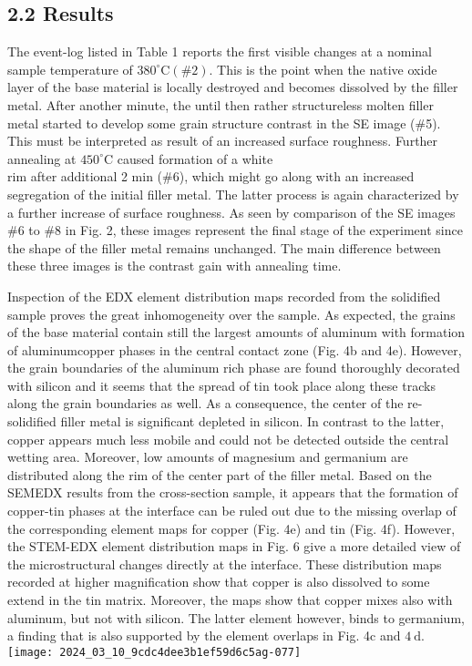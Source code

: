\documentclass[10pt]{article}
\begin{document}
\subsection*{2.2 Results}
The event-log listed in Table 1 reports the first visible changes at a nominal sample temperature of $380^{\circ} \mathrm{C}(\# 2)$. This is the point when the native oxide layer of the base material is locally destroyed and becomes dissolved by the filler metal. After another minute, the until then rather structureless molten filler metal started to develop some grain structure contrast in the SE image (\#5). This must be interpreted as result of an increased surface roughness. Further annealing at $450^{\circ} \mathrm{C}$ caused formation of a white\\
rim after additional 2 min (\#6), which might go along with an increased segregation of the initial filler metal. The latter process is again characterized by a further increase of surface roughness. As seen by comparison of the SE images \#6 to \#8 in Fig. 2, these images represent the final stage of the experiment since the shape of the filler metal remains unchanged. The main difference between these three images is the contrast gain with annealing time.

Inspection of the EDX element distribution maps recorded from the solidified sample proves the great inhomogeneity over the sample. As expected, the grains of the base material contain still the largest amounts of aluminum with formation of aluminumcopper phases in the central contact zone (Fig. 4b and 4e). However, the grain boundaries of the aluminum rich phase are found thoroughly decorated with silicon and it seems that the spread of tin took place along these tracks along the grain boundaries as well. As a consequence, the center of the re-solidified filler metal is significant depleted in silicon. In contrast to the latter, copper appears much less mobile and could not be detected outside the central wetting area. Moreover, low amounts of magnesium and germanium are distributed along the rim of the center part of the filler metal. Based on the SEMEDX results from the cross-section sample, it appears that the formation of copper-tin phases at the interface can be ruled out due to the missing overlap of the corresponding element maps for copper (Fig. 4e) and tin (Fig. 4f). However, the STEM-EDX element distribution maps in Fig. 6 give a more detailed view of the microstructural changes directly at the interface. These distribution maps recorded at higher magnification show that copper is also dissolved to some extend in the tin matrix. Moreover, the maps show that copper mixes also with aluminum, but not with silicon. The latter element however, binds to germanium, a finding that is also supported by the element overlaps in Fig. 4c and $4 \mathrm{~d}$.\\
\texttt{[image: 2024\_03\_10\_9cdc4dee3b1ef59d6c5ag-077]}
\end{document}
